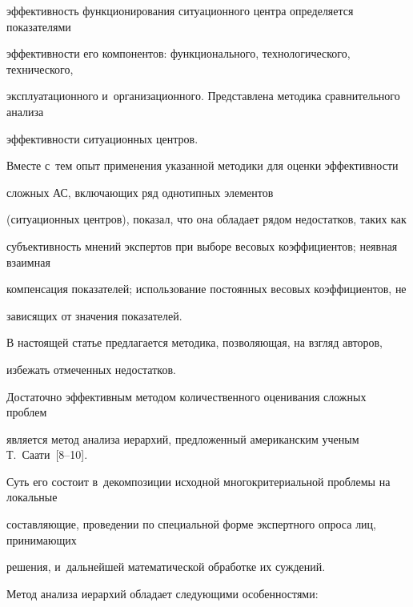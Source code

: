 эффективность функционирования ситуационного центра определяется показателями 

эффективности его компонентов: функционального, технологического, технического, 

эксплуатационного и~организационного. Представлена методика сравнительного анализа 

эффективности ситуационных центров.

      

      Вместе с~тем опыт применения указанной методики для оценки эффективности 

сложных АС, включающих ряд однотипных элементов 

(ситуационных центров), показал, что она обладает рядом недостатков, таких как 

субъективность мнений экспертов при выборе весовых коэффициентов; неявная взаимная 

компенсация показателей; использование постоянных весовых коэффициентов, не 

зависящих от значения показателей.

      

      В настоящей статье предлагается методика, позволяющая, на взгляд авторов, 

избежать отмеченных недостатков.

      

      Достаточно эффективным методом количественного оценивания сложных проблем 

является метод анализа иерархий, предложенный американским ученым Т.~Саати~[8--10]. 

Суть его состоит в~декомпозиции исходной многокритериальной проблемы на локальные 

составляющие, проведении по специальной форме экспертного опроса лиц, принимающих 

решения, и~дальнейшей математической обработке их суждений.

      

      Метод анализа иерархий обладает следующими особенностями: 


